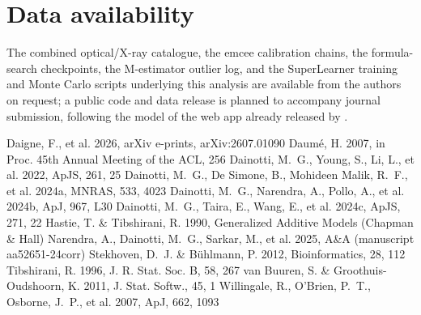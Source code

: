 \documentclass{aa}
\begin{document}
\section{Data availability}
\label{sec:data-availability}

The combined optical/X-ray catalogue, the emcee calibration chains, the
formula-search checkpoints, the M-estimator outlier log, and the SuperLearner
training and Monte Carlo scripts underlying this analysis are available from
the authors on request; a public code and data release is planned to
accompany journal submission, following the model of the web app already
released by \citet{narendra2025}.

\begin{thebibliography}{}
 Daigne, F., et al. 2026, arXiv e-prints,
  arXiv:2607.01090
 Daum\'e, H. 2007, in Proc. 45th Annual Meeting of
  the ACL, 256
 Dainotti, M.~G., Young, S.,
  Li, L., et al. 2022, ApJS, 261, 25
 Dainotti, M.~G., De Simone, B.,
  Mohideen Malik, R.~F., et al. 2024a, MNRAS, 533, 4023
 Dainotti, M.~G., Narendra, A.,
  Pollo, A., et al. 2024b, ApJ, 967, L30
 Dainotti, M.~G., Taira, E.,
  Wang, E., et al. 2024c, ApJS, 271, 22
 Hastie, T. \& Tibshirani, R. 1990,
  Generalized Additive Models (Chapman \& Hall)
 Narendra, A., Dainotti, M.~G.,
  Sarkar, M., et al. 2025, A\&A (manuscript aa52651-24corr)
 Stekhoven, D.~J. \&
  B\"uhlmann, P. 2012, Bioinformatics, 28, 112
 Tibshirani, R. 1996, J. R. Stat. Soc. B,
  58, 267
 van Buuren, S. \&
  Groothuis-Oudshoorn, K. 2011, J. Stat. Softw., 45, 1
 Willingale, R., O'Brien, P.~T.,
  Osborne, J.~P., et al. 2007, ApJ, 662, 1093
\end{thebibliography}
\end{document}
